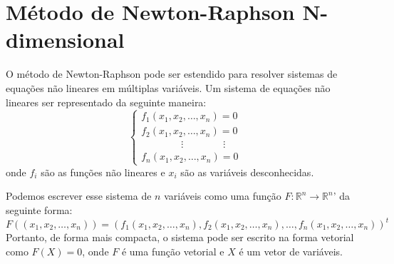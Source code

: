\section{Método de Newton-Raphson N-dimensional}
O método de Newton-Raphson pode ser estendido para resolver sistemas de
equações não lineares em múltiplas variáveis. Um sistema de equações não
lineares ser representado da seguinte maneira:
\begin{equation*}
    \begin{cases}
        f_1(x_1, x_2, \ldots, x_n) = 0             \\
        f_2(x_1, x_2, \ldots, x_n) = 0             \\
        \qquad \qquad \vdots \qquad \qquad  \vdots \\
        f_n(x_1, x_2, \ldots, x_n) = 0
    \end{cases}
\end{equation*}
onde  \(f_i \) são as funções não lineares e \(x_i\) são as variáveis desconhecidas.

Podemos escrever esse sistema de \textbf{\(n\)} variáveis como uma função
\textbf{\(F : \mathbb{R}^n \rightarrow \mathbb{R}^n\)}' da seguinte forma:
\begin{equation*}
    F((x_1, x_2, \ldots, x_n)) = (f_1(x_1, x_2, \ldots, x_n), f_2(x_1, x_2, \ldots, x_n), \ldots, f_n(x_1, x_2, \ldots, x_n))^{t}
\end{equation*}
Portanto, de forma mais compacta, o sistema pode ser escrito na forma vetorial como \textbf{\(F(X) = 0\)}, onde \textbf{\(F\)} é uma função vetorial e \(X\) é um vetor de variáveis.

